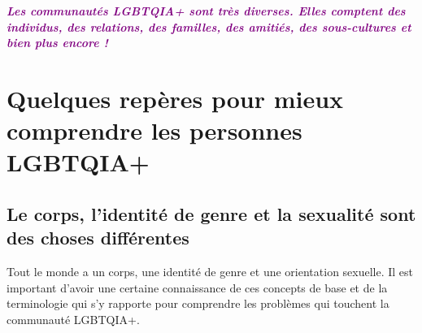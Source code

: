 \documentclass[12pt,openany]{book}
\renewenvironment{quote}{%
  \list{}{%
    \leftmargin-0.1cm   %
    \rightmargin\leftmargin
  }
  \item\relax
}
{\endlist}
\begin{document}
\newpage
\thispagestyle{empty}
\begin{quote}
\centering
\doublespacing
\textit{\Large \textcolor{purple}{\textbf{Les communautés \mbox{LGBTQIA+} sont très diverses. Elles comptent des individus, des relations, des familles, des amitiés, des sous-cultures et bien plus encore !}}}
\end{quote}

\begin{figure}[h]
    \centering
\end{figure}

\chapter*{Quelques repères pour mieux comprendre les personnes \mbox{LGBTQIA+}}

\section*{Le corps, l’identité de genre et la sexualité sont des choses différentes}

\noindent Tout le monde a un corps, une identité de genre et une orientation sexuelle. Il est important d’avoir une certaine connaissance de ces concepts de base et de la terminologie qui s’y rapporte pour comprendre les problèmes qui touchent la communauté \mbox{LGBTQIA+}.
\end{document}
